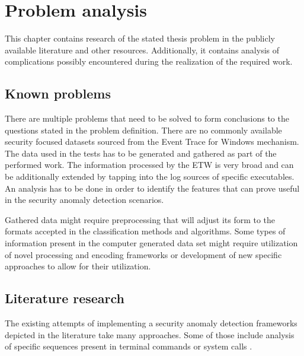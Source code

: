 \documentclass[a4paper,twoside,12pt]{book}
\begin{document}
\chapter{Problem analysis}

This chapter contains research of the stated thesis problem in the publicly available  
literature and other resources. Additionally, it contains analysis of complications possibly encountered
during the realization of the required work.  

\section{Known problems}
There are multiple problems that need to be solved to form conclusions to the questions stated in the
problem definition.
There are no commonly available security focused datasets sourced from the Event Trace for 
Windows mechanism. The data used in the tests has to be generated and gathered as part of the
performed work. The information processed by the ETW is very broad and can be additionally extended 
by tapping into the log sources of specific executables.
An analysis has to be done in order to identify the features that can prove useful in the security
anomaly detection scenarios. 

Gathered data might require preprocessing that will adjust its form to the formats accepted in the
classification methods and algorithms. Some types of information present in the computer 
generated data set might require utilization of novel processing and encoding frameworks or 
development of new specific approaches to allow for their utilization.  

\section{Literature research}

The existing attempts of implementing a security anomaly detection frameworks depicted in the 
literature take many approaches. Some of those include analysis of specific sequences
present in terminal commands \cite{bib:lane1997application} or system calls \cite{bib:forest}. 
\end{document}
